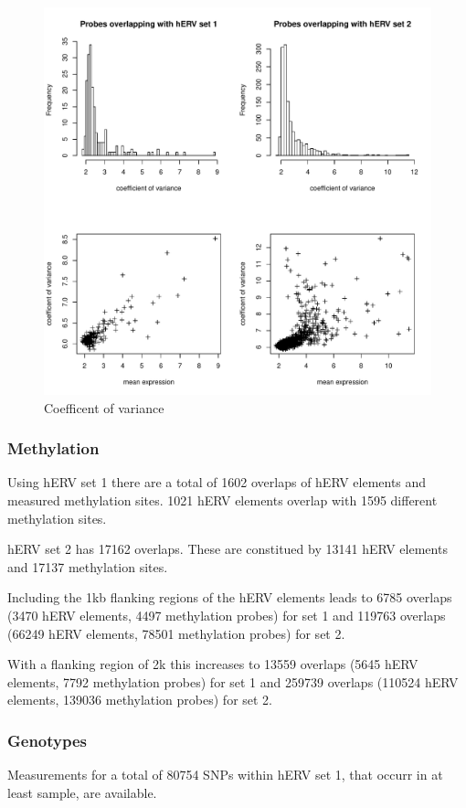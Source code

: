 \documentclass[a4paper,12pt]{article}
\begin{document}
\begin{figure}[b]
	\includegraphics[scale = 0.8, keepaspectratio = true]{../figures/herv_expr_var}  
	\caption{Coefficent of variance}
    \label{fig:herv.expr.var}
\end{figure}

\subsubsection{Methylation}
Using hERV set 1 there are a total of 1602 overlaps of hERV elements and measured methylation sites. 1021 hERV elements overlap with 1595 different methylation sites.

hERV set 2 has 17162 overlaps. These are constitued by 13141 hERV elements and 17137 methylation sites.

Including the 1kb flanking regions of the hERV elements leads to 6785 overlaps (3470 hERV elements, 4497 methylation probes) for set 1 and 119763 overlaps (66249 hERV elements, 78501 methylation probes) for set 2.

With a flanking region of 2k this increases to 13559 overlaps (5645 hERV elements, 7792 methylation probes) for set 1 and 259739 overlaps (110524 hERV elements, 139036 methylation probes) for set 2. 

\subsubsection{Genotypes}
Measurements for a total of 80754 SNPs within hERV set 1, that occurr in at least  sample, are available.
\end{document}
